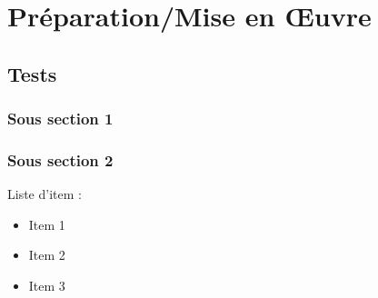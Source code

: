 \chapter{Préparation/Mise en Œuvre}

\section{Tests}

\subsection{Sous section 1}

\subsection{Sous section 2}

Liste d'item :
\begin{itemize}
\item Item 1
\item Item 2
\item Item 3
\end{itemize}

